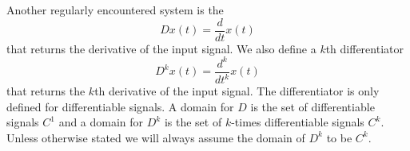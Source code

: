 
Another regularly encountered system is the 
\[
Dx(t) = \frac{d}{dt} x(t)
\]
that returns the derivative of the input signal.  We also define a $k$th differentiator
\[
D^k x(t) = \frac{d^k}{dt^k} x(t)
\]
that returns the $k$th derivative of the input signal.  %
The differentiator is only defined for differentiable signals.  A domain for $D$ is the set of differentiable signals $C^1$ and a domain for $D^k$ is the set of $k$-times differentiable signals $C^k$.  Unless otherwise stated we will always assume the domain of $D^k$ to be $C^k$.


